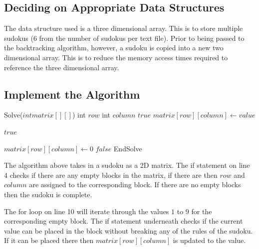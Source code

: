 \documentclass{article}
\begin{document}
\subsection{Deciding on Appropriate Data Structures}
The data structure used is a three dimensional array. This is to store multiple sudokus (6 from the number of sudokus per text file). Prior to being passed to the backtracking algorithm, however, a sudoku is copied into a new two dimensional array. This is to reduce the memory access times required to reference the three dimensional array.

\newpage

\subsection{Implement the Algorithm}

    \begin{algorithmic}[1]
    
    \STATE Solve($int matrix[][]$)
        \STATE int $row$
        \STATE int $column$
\newline
            \RETURN $true$
        \ENDIF
\newline
                \STATE $matrix[row][column]\gets value$
            
                    \RETURN $true$
                \ENDIF
                
                \STATE $matrix[row][column]\gets 0$
            \ENDIF
        \ENDFOR
\newline
        \RETURN $false$
    \STATE EndSolve
\newline
    \end{algorithmic}

The algorithm above takes in a sudoku as a 2D matrix. The if statement on line 4 checks if there are any empty blocks in the matrix, if there are then $row$ and $column$ are assigned to the corresponding block. If there are no empty blocks then the sudoku is complete. 

The for loop on line 10 will iterate through the values $1$ to $9$ for the corresponding empty block. The if statement underneath checks if the current value can be placed in the block without breaking any of the rules of the sudoku. If it can be placed there then $matrix[row][column]$ is updated to the value.
\end{document}
